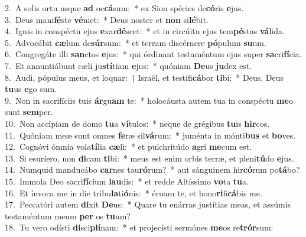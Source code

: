 {2.~}A solis ortu usque \textbf{ad} oc\textbf{cá}sum:~* ex Sion spécies de\textbf{có}ris \textbf{e}jus.\\
{3.~}Deus mani\textbf{fé}ste \textbf{vé}niet:~* Deus noster et \textbf{non} si\textbf{lé}bit.\\
{4.~}Ignis in conspéctu ejus \textbf{e}xar\textbf{dé}scet:~* et in circúitu ejus tem\textbf{pé}stas \textbf{vá}lida.\\
{5.~}Advocábit \textbf{cæ}lum de\textbf{súr}sum:~* et terram discérnere \textbf{pó}pulum \textbf{su}um.\\
{6.~}Congregáte illi \textbf{san}ctos \textbf{e}jus:~* qui órdinant testaméntum ejus super \textbf{sa}cri\textbf{fí}cia.\\
{7.~}Et annuntiábunt cæli ju\textbf{stí}tiam \textbf{e}jus:~* quóniam \textbf{De}us \textbf{ju}dex est.\\
{8.~}Audi, pópulus meus, et loquar:~† Israël, et testifi\textbf{cá}bor \textbf{ti}bi:~* Deus, Deus \textbf{tu}us \textbf{e}go sum.\\
{9.~}Non in sacrifíciis tuis \textbf{ár}gu\textbf{am} te:~* holocáusta autem tua in conspéctu \textbf{me}o sunt \textbf{sem}per.\\
{10.~}Non accípiam de domo \textbf{tu}a \textbf{ví}tulos:~* neque de grégibus \textbf{tu}is \textbf{hir}cos.\\
{11.~}Quóniam meæ sunt omnes \textbf{fe}ræ sil\textbf{vá}rum:~* juménta in mónti\textbf{bus} et \textbf{bo}ves.\\
{12.~}Cognóvi ómnia vola\textbf{tí}lia \textbf{cæ}li:~* et pulchritúdo \textbf{a}gri \textbf{me}cum est.\\
{13.~}Si esuríero, non \textbf{di}cam \textbf{ti}bi:~* meus est enim orbis terræ, et pleni\textbf{tú}do \textbf{e}jus.\\
{14.~}Numquid manducábo \textbf{car}nes tau\textbf{ró}rum?~* aut sánguinem hir\textbf{có}rum po\textbf{tá}bo?\\
{15.~}Immola Deo sacri\textbf{fí}cium \textbf{lau}dis:~* et redde Altíssimo \textbf{vo}ta \textbf{tu}a.\\
{16.~}Et ínvoca me in die tribu\textbf{la}ti\textbf{ó}nis:~* éruam te, et hono\textbf{ri}fi\textbf{cá}bis me.\\
{17.~}Peccatóri autem \textbf{di}xit \textbf{De}us:~* Quare tu enárras justítias meas, et assúmis testaméntum meum \textbf{per} os \textbf{tu}um?\\
{18.~}Tu vero odísti \textbf{di}sci\textbf{plí}nam:~* et projecísti sermónes \textbf{me}os re\textbf{trór}sum:\\
